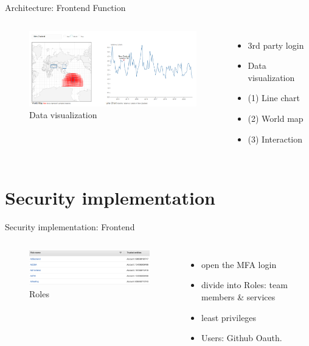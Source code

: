 \documentclass[aspectratio=169]{beamer}
\begin{document}
\begin{frame}[fragile]{Architecture: Frontend Function}

  \begin{columns}
      \begin{figure}[htbp]
        \centerline{\includegraphics[width=220pt]{images/Interaction_of_visualization.png}}
        \caption{Data visualization}
       \end{figure}

      \begin{itemize}
        \item 3rd party login
        \pause
        \item Data visualization
		\pause
		\item (1) Line chart
		\pause
		\item (2) World map
		\pause
		\item (3) Interaction
      \end{itemize}
  \end{columns}

\end{frame}

\section{Security implementation}

\begin{frame}[fragile]{Security implementation: Frontend}

  \begin{columns}
      \begin{figure}[htbp]
        \centerline{\includegraphics[width=220pt]{images/roles.png}}
        \caption{Roles}
      \end{figure}

      \begin{itemize}
        \item open the MFA login
        \item divide into Roles: team members \& services
        \item least privileges
        \pause
        \item Users: Github Oauth.
        
      \end{itemize}
  \end{columns}

\end{frame}
\end{document}

